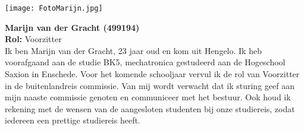 \vspace{1cm}

\begin{minipage}{0.5\linewidth}
	\texttt{[image: FotoMarijn.jpg]}
\end{minipage}
\hfill
\vspace{1cm}
\begin{minipage}{\linewidth}
	\textbf{Marijn van der Gracht (499194)} \\
	\textbf{Rol:} Voorzitter \\
	Ik ben Marijn van der Gracht, 23 jaar oud en kom uit Hengelo. Ik heb voorafgaand aan de studie BK5, mechatronica gestudeerd aan de Hogeschool Saxion in Enschede. Voor het komende schooljaar vervul ik de rol van Voorzitter in de buitenlandreis commissie. Van mij wordt verwacht dat ik sturing geef aan mijn naaste commissie genoten en communiceer met het bestuur. Ook houd ik rekening met de wensen van de aangesloten studenten bij onze studiereis, zodat iedereen een prettige studiereis heeft. 
\end{minipage}